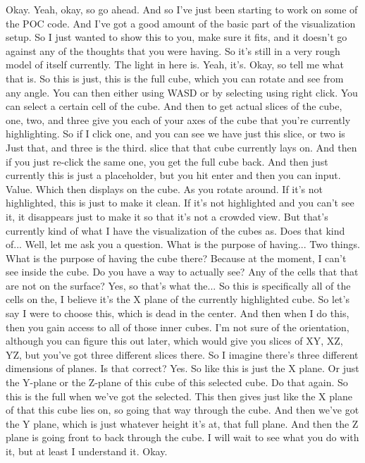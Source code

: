 \documentclass{article}
\begin{document}
Okay.
Yeah, okay, so go ahead. And so I've just been starting to work on some of the POC code.
And I've got a good amount of the basic part of the visualization setup. So I just wanted to show this to you, make sure it fits, and it doesn't go against any of the thoughts that you were having.
So it's still in a very rough model of itself currently. The light in here is. Yeah, it's. Okay, so tell me what that is. So this is just, this is the full cube, which you can rotate and see from any angle. You can then either using WASD or by selecting using right click.
You can select a certain cell of the cube. And then to get actual slices of the cube, one, two, and three give you each of your axes of the cube that you're currently highlighting. So if I click one, and you can see we have just this slice, or two is
Just that, and three is the third.
slice that that cube currently lays on. And then if you just re-click the same one, you get the full cube back. And then just currently this is just a placeholder, but you hit enter and then you can input.
Value.
Which then displays on the cube.
As you rotate around.
If it's not highlighted, this is just to make it clean. If it's not highlighted and you can't see it, it disappears just to make it so that it's not a crowded view. But that's currently kind of what I have the visualization of the cubes as. Does that kind of... Well, let me ask you a question. What is the purpose of having...
Two things. What is the purpose of having the cube there? Because at the moment, I can't see inside the cube. Do you have a way to actually see?
Any of the cells that that are not on the surface? Yes, so that's what the...
So this is specifically all of the cells on the, I believe it's the X plane of the currently highlighted cube. So let's say I were to choose this, which is dead in the center. And then when I do this, then you gain access to all of those inner cubes.
I'm not sure of the orientation, although you can figure this out later, which would give you slices of XY, XZ, YZ, but you've got three different slices there. So I imagine there's three different dimensions of planes. Is that correct? Yes. So like this is just the X plane.
Or just the Y-plane or the Z-plane of this cube of this selected cube.
Do that again. So this is the full when we've got the selected. This then gives just like the X plane of that this cube lies on, so going that way through the cube. And then we've got the Y plane, which is just whatever height it's at, that full plane. And then the Z plane is going front to back through the cube.
I will wait to see what you do with it, but at least I understand it. Okay.
\end{document}
